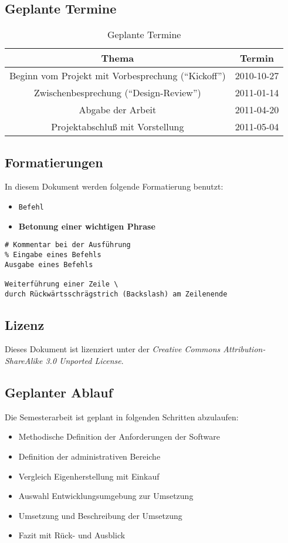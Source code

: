 \subsection{Geplante Termine} 
\begin{longtable}{|c|c|}
\caption{Geplante Termine}\\
\hline
Thema & Termin\\
\hline
Beginn vom Projekt mit Vorbesprechung ("`Kickoff"') & 2010-10-27 \\
\hline
Zwischenbesprechung ("`Design-Review"') & 2011-01-14 \\
\hline
Abgabe der Arbeit & 2011-04-20 \\
\hline
Projektabschluß mit Vorstellung & 2011-05-04 \\
\hline
\end{longtable}
\subsection{Formatierungen}
In diesem Dokument werden folgende Formatierung benutzt:
\begin{itemize}
\item \verb=Befehl=
\item \textbf{Betonung einer wichtigen Phrase}
\end{itemize}
\begin{verbatim}
# Kommentar bei der Ausführung
% Eingabe eines Befehls
Ausgabe eines Befehls

Weiterführung einer Zeile \
durch Rückwärtsschrägstrich (Backslash) am Zeilenende
\end{verbatim}
\subsection{Lizenz}
Dieses Dokument ist lizenziert unter der
\textit{Creative Commons Attribution-ShareAlike 3.0 Unported License}\cite{ccasa3}.
\subsection{Geplanter Ablauf}
Die Semesterarbeit ist geplant in folgenden Schritten abzulaufen:
\begin{itemize}
\item Methodische Definition der Anforderungen der Software
\item Definition der administrativen Bereiche
\item Vergleich Eigenherstellung mit Einkauf
\item Auswahl Entwicklungsumgebung zur Umsetzung
\item Umsetzung und Beschreibung der Umsetzung
\item Fazit mit Rück- und Ausblick
\end{itemize}
